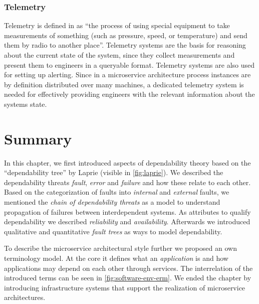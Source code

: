 %
%
%

\subsubsection{Telemetry}

Telemetry is defined in \cite{merriamwebstertelemetry} as ``the process of using special equipment to take measurements of something (such as pressure, speed, or temperature) and send them by radio to another place''. Telemetry systems are the basis for reasoning about the current state of the system, since they collect measurements and present them to engineers in a queryable format. Telemetry systems are also used for setting up alerting. Since in a microservice architecture process instances are by definition distributed over many machines, a dedicated telemetry system is needed for effectively providing engineers with the relevant information about the systems state.

\section{Summary}

In this chapter, we first introduced aspects of dependability theory based on the ``dependability tree'' by Laprie (visible in \autoref{fig:laprie}). We described the dependability threats \emph{fault}, \emph{error} and \emph{failure} and how these relate to each other. Based on the categorization of faults into \emph{internal} and \emph{external} faults, we mentioned the \emph{chain of dependability threats} as a model to understand propagation of failures between interdependent systems. As attributes to qualify dependability we described \emph{reliability} and \emph{availability}. Afterwards we introduced qualitative and quantitative \emph{fault trees} as ways to model dependability.

To describe the microservice architectural style further we proposed an own terminology model. At the core it defines what an \emph{application} is and how applications may depend on each other through services. The interrelation of the introduced terms can be seen in \autoref{fig:software-env-erm}. We ended the chapter by introducing infrastructure systems that support the realization of microservice architectures.